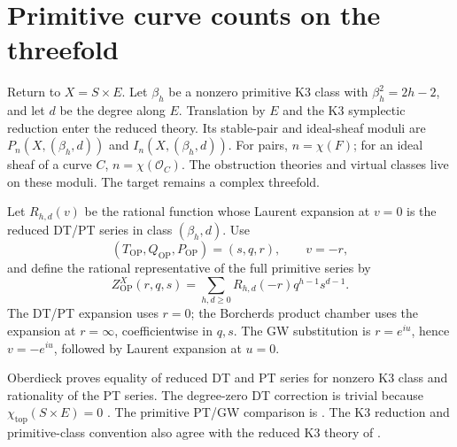 \section{Primitive curve counts on the threefold}
\label{sec:zbps-scalar-shadow}

Return to \(X=S\times E\).  Let \(\beta_h\) be a nonzero
primitive K3 class with \(\beta_h^2=2h-2\), and let \(d\) be
the degree along \(E\).  Translation by \(E\) and the K3
symplectic reduction enter the reduced theory.  Its stable-pair
and ideal-sheaf moduli are \(P_n(X,(\beta_h,d))\) and
\(I_n(X,(\beta_h,d))\).  For pairs, \(n=\chi(F)\); for an
ideal sheaf of a curve \(C\), \(n=\chi(\mathcal O_C)\).
The obstruction theories and virtual classes live on these moduli.
The target remains a complex threefold.

\begin{convention}
\label{conv:op-chamber}
Let \(R_{h,d}(v)\) be the rational function whose Laurent
expansion at \(v=0\) is the reduced DT/PT series in class
\((\beta_h,d)\).  Use
\[
 (T_{\mathrm{OP}},Q_{\mathrm{OP}},P_{\mathrm{OP}})=(s,q,r),
 \qquad v=-r,
\]
and define the rational representative of the full primitive
series by
\[
 Z^X_{\mathrm{OP}}(r,q,s)=
       \sum_{h,d\ge0}R_{h,d}(-r)q^{h-1}s^{d-1}.
\]
The DT/PT expansion uses \(r=0\); the Borcherds product chamber
uses the expansion at \(r=\infty\), coefficientwise in \(q,s\).
The GW substitution is \(r=e^{iu}\), hence \(v=-e^{iu}\),
followed by Laurent expansion at \(u=0\).
\end{convention}

Oberdieck proves equality of reduced DT and PT series for nonzero
K3 class and rationality of the PT series.  The degree-zero DT
correction is trivial because \(\chi_{\mathrm{top}}(S\times E)=0\)
\cite[Theorem~3]{OberdieckReducedPT}.  The primitive PT/GW
comparison is \cite[Proposition~5]{OPand}.  The K3 reduction and
primitive-class convention also agree with the reduced K3 theory
of \cite{MaulikPandharipande}.

